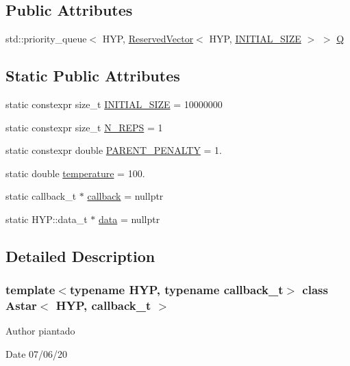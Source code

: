 \subsection*{Public Attributes}
\begin{DoxyCompactItemize}
\item 
std\+::priority\+\_\+queue$<$ H\+YP, \hyperlink{class_reserved_vector}{Reserved\+Vector}$<$ H\+YP, \hyperlink{class_astar_af674f24278326383c5972fc30f0b21d9}{I\+N\+I\+T\+I\+A\+L\+\_\+\+S\+I\+ZE} $>$ $>$ \hyperlink{class_astar_af96593236e2f3ea3d15b37d513308391}{Q}
\end{DoxyCompactItemize}
\subsection*{Static Public Attributes}
\begin{DoxyCompactItemize}
\item 
static constexpr size\+\_\+t \hyperlink{class_astar_af674f24278326383c5972fc30f0b21d9}{I\+N\+I\+T\+I\+A\+L\+\_\+\+S\+I\+ZE} = 10000000
\item 
static constexpr size\+\_\+t \hyperlink{class_astar_a4086ae1c376d4d1b8d456f46f09cfa8a}{N\+\_\+\+R\+E\+PS} = 1
\item 
static constexpr double \hyperlink{class_astar_a111836518f01d8d4495d00e3b2a17531}{P\+A\+R\+E\+N\+T\+\_\+\+P\+E\+N\+A\+L\+TY} = 1.
\item 
static double \hyperlink{class_astar_a9c708491f187aca582d7a3499a442bba}{temperature} = 100.
\item 
static callback\+\_\+t $\ast$ \hyperlink{class_astar_a73b7b4ac7d9bdea8b8ce19c94c901705}{callback} = nullptr
\item 
static H\+Y\+P\+::data\+\_\+t $\ast$ \hyperlink{class_astar_a6b4ed5bb7ce08dcdceea3697d4f8eb2b}{data} = nullptr
\end{DoxyCompactItemize}


\subsection{Detailed Description}
\subsubsection*{template$<$typename H\+YP, typename callback\+\_\+t$>$\newline
class Astar$<$ H\+Y\+P, callback\+\_\+t $>$}

\begin{DoxyAuthor}{Author}
piantado 
\end{DoxyAuthor}
\begin{DoxyDate}{Date}
07/06/20 
\end{DoxyDate}



